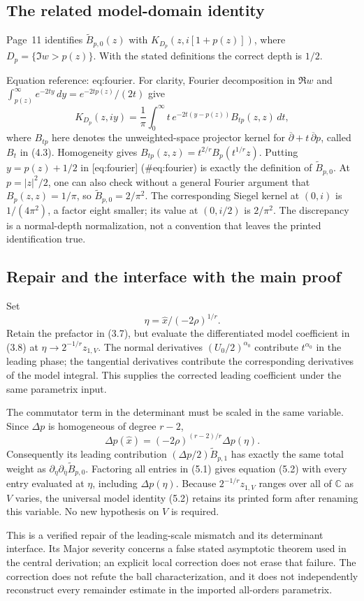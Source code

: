 \documentclass[10pt]{article}
\begin{document}
\subsection*{The related model-domain identity}
Page 11 identifies \(\widetilde B_{p,0}(z)\) with \(K_{D_p}(z,i[1+p(z)])\), where \(D_p=\{\Im w>p(z)\}\). With the stated definitions the correct depth is \(1/2\).\par
Equation reference: eq:fourier. For clarity, Fourier decomposition in \(\Re w\) and \(\int_{p(z)}^\infty e^{-2ty}\,dy=e^{-2tp(z)}/(2t)\) give \[K_{D_p}(z,iy)
 =\frac1\pi\int_0^\infty t\,e^{-2t(y-p(z))}B_{tp}(z,z)\,dt,
 \] where \(B_{tp}\) here denotes the unweighted-space projector kernel for \(\overline\partial+ t\,\overline\partial p\), called \(B_t\) in (4.3). Homogeneity gives \(B_{tp}(z,z)=t^{2/r}B_p(t^{1/r}z)\). Putting \(y=p(z)+1/2\) in [eq:fourier] (\#eq:fourier) is exactly the definition of \(\widetilde B_{p,0}\). At \(p=|z|^2/2\), one can also check without a general Fourier argument that \(B_p(z,z)=1/\pi\), so \(\widetilde B_{p,0}=2/\pi^2\). The corresponding Siegel kernel at \((0,i)\) is \(1/(4\pi^2)\), a factor eight smaller; its value at \((0,i/2)\) is \(2/\pi^2\). The discrepancy is a normal-depth normalization, not a convention that leaves the printed identification true.\par
\subsection*{Repair and the interface with the main proof}
Set \[\eta=\widehat x/(-2\rho)^{1/r}.\] Retain the prefactor in (3.7), but evaluate the differentiated model coefficient in (3.8) at \(\eta\to2^{-1/r}z_{1,V}\). The normal derivatives \((U_0/2)^{\alpha_0}\) contribute \(t^{\alpha_0}\) in the leading phase; the tangential derivatives contribute the corresponding derivatives of the model integral. This supplies the corrected leading coefficient under the same parametrix input.\par
The commutator term in the determinant must be scaled in the same variable. Since \(\Delta p\) is homogeneous of degree \(r-2\), \[\Delta p(\widehat x)
 =(-2\rho)^{(r-2)/r}\Delta p(\eta).\] Consequently its leading contribution \((\Delta p/2)\widetilde B_{p,1}\) has exactly the same total weight as \(\partial_\eta\partial_{\bar\eta}\widetilde B_{p,0}\). Factoring all entries in (5.1) gives equation (5.2) with every entry evaluated at \(\eta\), including \(\Delta p(\eta)\). Because \(2^{-1/r}z_{1,V}\) ranges over all of \(\mathbb C\) as \(V\) varies, the universal model identity (5.2) retains its printed form after renaming this variable. No new hypothesis on \(V\) is required.\par
This is a verified repair of the leading-scale mismatch and its determinant interface. Its Major severity concerns a false stated asymptotic theorem used in the central derivation; an explicit local correction does not erase that failure. The correction does not refute the ball characterization, and it does not independently reconstruct every remainder estimate in the imported all-orders parametrix.\par
\end{document}
